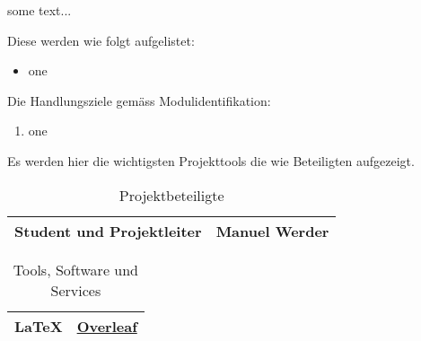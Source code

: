 
\label{einleitung}
\setcounter{page}{1}
\normalsize
some text...

Diese werden wie folgt aufgelistet:
\begin{itemize}
    \item one
\end{itemize}


Die Handlungsziele gemäss Modulidentifikation:

\begin{enumerate}
    \item one
\end{enumerate}


Es werden hier die wichtigsten Projekttools die wie Beteiligten aufgezeigt.

\begin{table}[h!]
    \centering
    \begin{tabularx}{0.8\textwidth} {
    | >{\raggedright\arraybackslash}X
    | >{\raggedright\arraybackslash}X | }
        \hline
        \sffamily Student und Projektleiter & \sffamily  Manuel Werder \\
        \hline
    \end{tabularx}
    \caption{\sffamily Projektbeteiligte}
    \label{tab:1}
\end{table}

\begin{table}[h!]
    \centering
    \begin{tabularx}{0.8\textwidth} {
    | >{\raggedright\arraybackslash}X
    | >{\raggedright\arraybackslash}X | }
        \hline
        \LaTeX & \sffamily \href{https://www.overleaf.com}{Overleaf} \\
        \hline
    \end{tabularx}
    \caption{\sffamily Tools, Software und Services}
    \label{tab:2}
\end{table}
